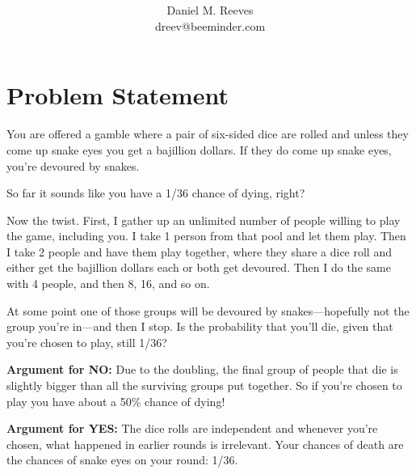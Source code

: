 \documentclass[article,twocolumn]{memoir}
\title{\HUGE\textbf{\longtitle}}
\author{Daniel M. Reeves\\dreev@beeminder.com}
\date{\protect\tstamp} %
\begin{document}
\pagestyle{headings}
\maketitle




\chapter*{Problem Statement}

You are offered a gamble where a pair of six-sided dice are rolled and unless they come up snake eyes you get a bajillion dollars. 
If they do come up snake eyes, you're devoured by snakes.

So far it sounds like you have a 1/36 chance of dying, right?

Now the twist. 
First, I gather up an unlimited number of people willing to play the game, including you. 
I take 1 person from that pool and let them play. 
Then I take 2 people and have them play together, where they share a dice roll and either get the bajillion dollars each or both get devoured. 
Then I do the same with 4 people, and then 8, 16, and so on.

At some point one of those groups will be devoured by snakes---hopefully not the group you're in---and then I stop.
Is the probability that you'll die, given that you're chosen to play, still 1/36?

\vfill

\textbf{Argument for NO:}
Due to the doubling, the final group of people that die is slightly bigger than all the surviving groups put together. 
So if you're chosen to play you have about a 50\% chance of dying!

\vspace{1em}

\textbf{Argument for YES:}
The dice rolls are independent and whenever you're chosen, what happened in earlier rounds is irrelevant.
Your chances of death are the chances of snake eyes on your round: 1/36.
\end{document}
